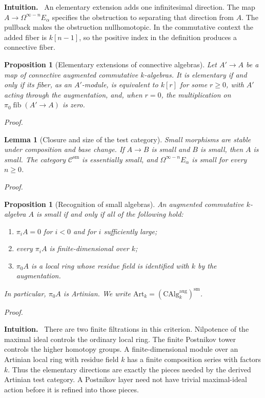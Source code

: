 \documentclass[12pt,letterpaper,oneside]{report}
\newtheorem{proposition}[theorem]{Proposition}
\newtheorem{lemma}[theorem]{Lemma}
\theoremstyle{definition}
\theoremstyle{remark}
\renewenvironment{proof}[1][Proof]{\par\nopagebreak[4]\addvspace{4pt}\noindent\textit{#1.}\par\nobreak\vspace{0.5\baselineskip}}{\par\addvspace{4pt}}
\newenvironment{intuition}{\par\noindent\textbf{Intuition.}\ }{\par}
\newcommand{\cC}{\mathcal C}
\newcommand{\CAlg}{\mathrm{CAlg}}
\newcommand{\Art}{\mathrm{Art}_k}
\newcommand{\fib}{\operatorname{fib}}
\newcommand{\aug}{\mathrm{aug}}
\newcommand{\sm}{\mathrm{sm}}
\begin{document}
\begin{intuition}
An elementary extension adds one infinitesimal direction. The map $A\to\Omega^{\infty-n}E_\alpha$ specifies the obstruction to separating that direction from $A$. The pullback makes the obstruction nullhomotopic. In the commutative context the added fiber is $k[n-1]$, so the positive index in the definition produces a connective fiber.
\end{intuition}

\begin{proposition}[Elementary extensions of connective algebras]
\label{prop:elementary}
Let $A'\to A$ be a map of connective augmented commutative $k$-algebras. It is elementary if and only if its fiber, as an $A'$-module, is equivalent to $k[r]$ for some $r\geq0$, with $A'$ acting through the augmentation, and, when $r=0$, the multiplication on $\pi_0\fib(A'\to A)$ is zero.
\end{proposition}
\begin{proof}
\end{proof}


\begin{lemma}[Closure and size of the test category]
Small morphisms are stable under composition and base change. If $A\to B$ is small and $B$ is small, then $A$ is small. The category $\cC^{\sm}$ is essentially small, and $\Omega^{\infty-n}E_\alpha$ is small for every $n\geq0$.
\end{lemma}
\begin{proof}
\end{proof}


\begin{proposition}[Recognition of small algebras]
\label{prop:artinian}
An augmented commutative $k$-algebra $A$ is small if and only if all of the following hold:
\begin{enumerate}
\item $\pi_i A=0$ for $i<0$ and for $i$ sufficiently large;
\item every $\pi_i A$ is finite-dimensional over $k$;
\item $\pi_0 A$ is a local ring whose residue field is identified with $k$ by the augmentation.
\end{enumerate}
In particular, $\pi_0 A$ is Artinian. We write $\Art=(\CAlg_k^{\aug})^{\sm}$.
\end{proposition}
\begin{proof}
\end{proof}


\begin{intuition}
There are two finite filtrations in this criterion. Nilpotence of the maximal ideal controls the ordinary local ring. The finite Postnikov tower controls the higher homotopy groups. A finite-dimensional module over an Artinian local ring with residue field $k$ has a finite composition series with factors $k$. Thus the elementary directions are exactly the pieces needed by the derived Artinian test category. A Postnikov layer need not have trivial maximal-ideal action before it is refined into those pieces.
\end{intuition}
\end{document}
